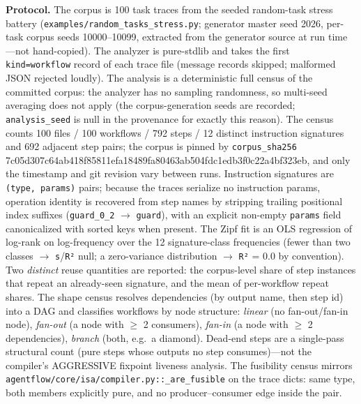 \documentclass[
  11pt,
]{article}
\begin{document}
\textbf{Protocol.} The corpus is 100 task traces from the seeded
random-task stress battery (\texttt{examples/random\_tasks\_stress.py};
generator master seed 2026, per-task corpus seeds 10000--10099,
extracted from the generator source at run time---not hand-copied). The
analyzer is pure-stdlib and takes the first \texttt{kind=workflow}
record of each trace file (message records skipped; malformed JSON
rejected loudly). The analysis is a deterministic full census of the
committed corpus: the analyzer has no sampling randomness, so multi-seed
averaging does not apply (the corpus-generation seeds are recorded;
\texttt{analysis\_seed} is null in the provenance for exactly this
reason). The census counts 100 files / 100 workflows / 792 steps / 12
distinct instruction signatures and 692 adjacent step pairs; the corpus
is pinned by \texttt{corpus\_sha256}
7c05d307c64ab418f85811efa18489fa80463ab504fdc1edb3f0c22a4bf323eb, and
only the timestamp and git revision vary between runs. Instruction
signatures are \texttt{(type,\ params)} pairs; because the traces
serialize no instruction params, operation identity is recovered from
step names by stripping trailing positional index suffixes
(\texttt{guard\_0\_2} \(\rightarrow\) \texttt{guard}), with an explicit
non-empty \texttt{params} field canonicalized with sorted keys when
present. The Zipf fit is an OLS regression of log-rank on log-frequency
over the 12 signature-class frequencies (fewer than two classes
\(\rightarrow\) \texttt{s}/\texttt{R²} null; a zero-variance
distribution \(\rightarrow\) \texttt{R²} = 0.0 by convention). Two
\emph{distinct} reuse quantities are reported: the corpus-level share of
step instances that repeat an already-seen signature, and the mean of
per-workflow repeat shares. The shape census resolves dependencies (by
output name, then step id) into a DAG and classifies workflows by node
structure: \emph{linear} (no fan-out/fan-in node), \emph{fan-out} (a
node with \(\geq\) 2 consumers), \emph{fan-in} (a node with \(\geq\) 2
dependencies), \emph{branch} (both, e.g.~a diamond). Dead-end steps are
a single-pass structural count (pure steps whose outputs no step
consumes)---not the compiler's AGGRESSIVE fixpoint liveness analysis.
The fusibility census mirrors
\texttt{agentflow/core/isa/compiler.py::\_are\_fusible} on the trace
dicts: same type, both members explicitly pure, and no
producer--consumer edge inside the pair.
\end{document}
